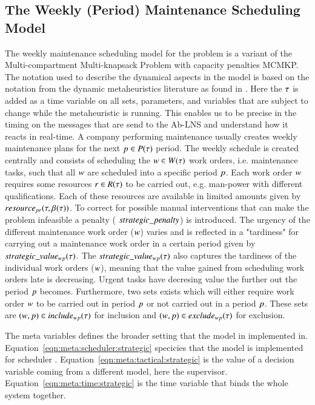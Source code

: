 \subsection{The Weekly (Period) Maintenance Scheduling Model}
The weekly maintenance scheduling model for the problem
is a variant of the  Multi-compartment Multi-knapsack Problem with capacity penalties MCMKP.
The notation used to describe the dynamical aspects in the model is based on the notation
from the dynamic metaheuristics literature as found in \cite{yangMetaheuristicsDynamicCombinatorial2013}.
Here the $\tau$ is added as a time variable on all sets, parameters, and variables that are
subject to change while the metaheuristic is running. This enables us to be precise in the timing on
the messages that are send to the Ab-LNS and understand how it reacts in real-time.
A company performing maintenance usually creates weekly maintenance plans for
the next $p \in P(\tau)$ period. The weekly schedule is created
centrally and consists of scheduling the $\ElementWorkOrder \in \SetWorkOrder$
work orders, i.e. maintenance tasks, such that all $w$
are scheduled into a specific period $p$. Each work order $
w$ requires some resources $r \in R(\tau)$
to be carried out, e.g. man-power with different qualifications. Each of these
resources are available in limited amounts given by $resource_{pr}(\tau, \beta_{}(\tau))$. To correct
for possible manual interventions that can make the problem infeasible a penalty (
$strategic\_penalty$) is introduced. The urgency of the different maintenance work order ($w$)
varies and is reflected in a "tardiness" for carrying out a maintenance work
order in a certain period given by $strategic\_value_{w p}(\tau)$. The $strategic\_value_{w p}(\tau)$ also
captures the tardiness of the individual work orders ($w$), meaning that
the value gained from scheduling work orders late is decreasing. Urgent tasks have
decresing value the further out the period $p$ becomes.
Furthermore, two sets exists which will either require work order $w$ to be carried
out in period $p$ or not carried out in a period $p$.
These sets are $(w,p) \in
include_{wp}(\tau)$ for inclusion and  $(w, p) \in
exclude_{wp}(\tau)$ for exclusion.


\strategicmodel[clustering=false]

The meta variables defines the broader setting that the model in implemented in.
Equation~\eqref{eqn:meta:scheduler:strategic} specicies that the model is
implemented for scheduler \ElementScheduler. Equation~\eqref{eqn:meta:tactical:strategic} is the value
of a decision variable coming from a different model, here the supervisor.
Equation~\eqref{eqn:meta:time:strategic} is the time variable that binds the whole
system together.

